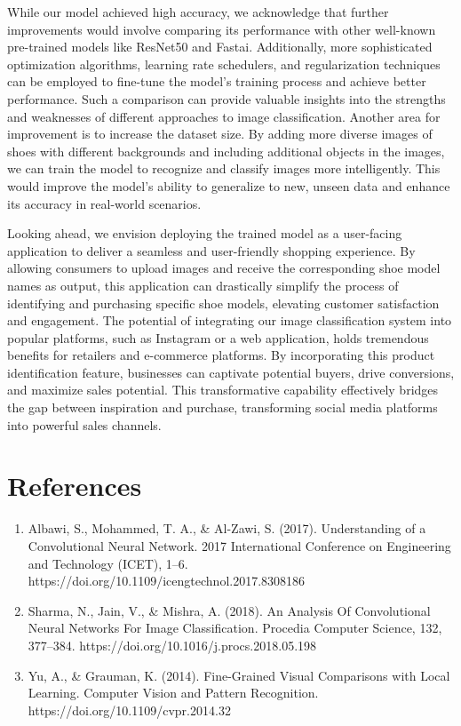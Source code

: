 \documentclass[11pt,a4paper]{article}
\begin{document}
\noindent While our model achieved high accuracy, we acknowledge that further improvements would involve comparing its performance with other well-known pre-trained models like ResNet50 and Fastai. Additionally, more sophisticated optimization algorithms, learning rate schedulers, and regularization techniques can be employed to fine-tune the model's training process and achieve better performance. Such a comparison can provide valuable insights into the strengths and weaknesses of different approaches to image classification. Another area for improvement is to increase the dataset size. By adding more diverse images of shoes with different backgrounds and including additional objects in the images, we can train the model to recognize and classify images more intelligently. This would improve the model's ability to generalize to new, unseen data and enhance its accuracy in real-world scenarios.

\noindent Looking ahead, we envision deploying the trained model as a user-facing application to deliver a seamless and user-friendly shopping experience. By allowing consumers to upload images and receive the corresponding shoe model names as output, this application can drastically simplify the process of identifying and purchasing specific shoe models, elevating customer satisfaction and engagement. The potential of integrating our image classification system into popular platforms, such as Instagram or a web application, holds tremendous benefits for retailers and e-commerce platforms. By incorporating this product identification feature, businesses can captivate potential buyers, drive conversions, and maximize sales potential. This transformative capability effectively bridges the gap between inspiration and purchase, transforming social media platforms into powerful sales channels.

\pagebreak
\section{References} 
		\begin{enumerate}
		\item Albawi, S., Mohammed, T. A., \& Al-Zawi, S. (2017). Understanding of a Convolutional Neural Network. 2017 International Conference on Engineering and Technology (ICET), 1–6. https://doi.org/10.1109/icengtechnol.2017.8308186
		
		\item Sharma, N., Jain, V., \& Mishra, A. (2018). An Analysis Of Convolutional Neural Networks For Image Classification. Procedia Computer Science, 132, 377–384. https://doi.org/10.1016/j.procs.2018.05.198
		\item Yu, A., \& Grauman, K. (2014). Fine-Grained Visual Comparisons with Local Learning. Computer Vision and Pattern Recognition. https://doi.org/10.1109/cvpr.2014.32 
		\end{enumerate}
\end{document}
